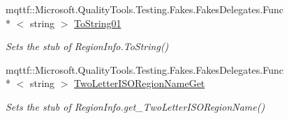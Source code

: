 \begin{DoxyCompactItemize}
mqttf\-::\-Microsoft.\-Quality\-Tools.\-Testing.\-Fakes.\-Fakes\-Delegates.\-Func\\*
$<$ string $>$ \hyperlink{class_system_1_1_globalization_1_1_fakes_1_1_stub_region_info_a9c81422884a8b642461e497e10ee8be3}{To\-String01}
\begin{DoxyCompactList}\small\item\em Sets the stub of Region\-Info.\-To\-String()\end{DoxyCompactList}\item 
mqttf\-::\-Microsoft.\-Quality\-Tools.\-Testing.\-Fakes.\-Fakes\-Delegates.\-Func\\*
$<$ string $>$ \hyperlink{class_system_1_1_globalization_1_1_fakes_1_1_stub_region_info_aa726204bb371b2cc1cfc1d63eae8c9b2}{Two\-Letter\-I\-S\-O\-Region\-Name\-Get}
\begin{DoxyCompactList}\small\item\em Sets the stub of Region\-Info.\-get\-\_\-\-Two\-Letter\-I\-S\-O\-Region\-Name()\end{DoxyCompactList}\end{DoxyCompactItemize}
